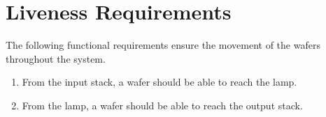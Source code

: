 \section{Liveness Requirements}

The following functional requirements ensure the movement of the wafers throughout the system.

\begin{enumerate}
    \item From the input stack, a wafer should be able to reach the lamp.
    \item From the lamp, a wafer should be able to reach the output stack.
\end{enumerate}